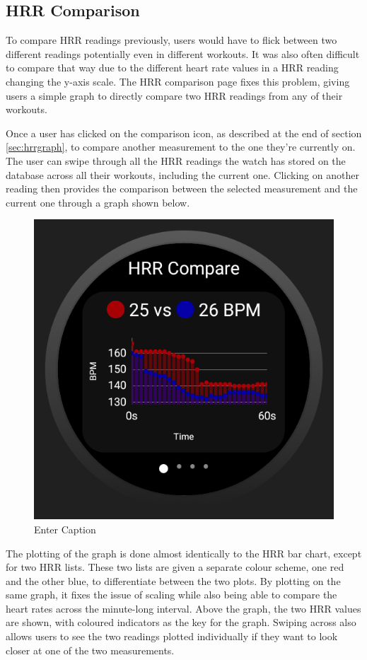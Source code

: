 \documentclass{l4proj}
\begin{document}
\subsection{HRR Comparison}
\label{sec:hrrcomparison}

To compare HRR readings previously, users would have to flick between two different readings potentially even in different workouts. It was also often difficult to compare that way due to the different heart rate values in a HRR reading changing the y-axis scale. The HRR comparison page fixes this problem, giving users a simple graph to directly compare two HRR readings from any of their workouts.

Once a user has clicked on the comparison icon, as described at the end of section \ref{sec:hrrgraph}, to compare another measurement to the one they're currently on. The user can swipe through all the HRR readings the watch has stored on the database across all their workouts, including the current one. Clicking on another reading then provides the comparison between the selected measurement and the current one through a graph shown below.

\begin{figure}[h!]
    \centering
    \includegraphics[width=0.5\linewidth]{dissertation//dissImages/HRRCompareGraph.png}
    \caption{Enter Caption}
    \label{fig:enter-label}
\end{figure}

The plotting of the graph is done almost identically to the HRR bar chart, except for two HRR lists. These two lists are given a separate colour scheme, one red and the other blue, to differentiate between the two plots. By plotting on the same graph, it fixes the issue of scaling while also being able to compare the heart rates across the minute-long interval. Above the graph, the two HRR values are shown, with coloured indicators as the key for the graph. Swiping across also allows users to see the two readings plotted individually if they want to look closer at one of the two measurements.
\end{document}
